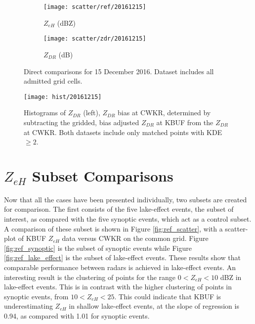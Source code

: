 \begin{figure}[p]
\centering
   \begin{subfigure}{0.49\linewidth} \centering
     \texttt{[image: scatter/ref/20161215]}
     \caption{$Z_{eH}$ (dBZ)}\label{fig:scatter_ref_20161215}
   \end{subfigure}
   \begin{subfigure}{0.49\linewidth} \centering
     \texttt{[image: scatter/zdr/20161215]}
     \caption{$Z_{DR}$ (dB)}\label{fig:scatter_zdr_20161215}
   \end{subfigure}
\caption{Direct comparisons for 15 December 2016. Dataset includes all admitted grid cells.} \label{fig:scatter_20161215}
\end{figure}

\begin{figure}[p]
\texttt{[image: hist/20161215]}\centering
\caption{Histograms of $Z_{DR}$ (left), $Z_{DR}$ bias at CWKR, determined by subtracting the gridded, bias adjusted $Z_{DR}$ at KBUF from the $Z_{DR}$ at
CWKR. Both datasets include only matched points with KDE $\geq 2$. } 
\label{fig:hist_20161215}
\end{figure}

\section{$Z_{eH}$ Subset Comparisons}
Now that all the cases have been presented individually, two subsets are created for comparison. The first consists of the five lake-effect events, the
subset of interest, as compared with the five synoptic events, which act as a control subset.
A comparison of these subset is shown in Figure \ref{fig:ref_scatter}, with a scatter-plot of KBUF $Z_{eH}$ data versus CWKR on the common grid. Figure
\ref{fig:ref_synoptic} is the subset of synoptic events while Figure \ref{fig:ref_lake_effect} is the subset of lake-effect events. These results show that
comparable performance between radars is achieved in lake-effect events. An interesting result is the clustering of points for the range $0 < Z_{eH} < 10$ dBZ in lake-effect events. This is in contrast with the higher clustering of points in synoptic events, from $10 < Z_{eH} < 25$. This could indicate that KBUF is underestimating $Z_{eH}$ in shallow lake-effect events, at the slope of regression is 0.94, as compared with 1.01 for synoptic events.

